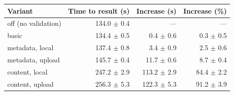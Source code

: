 \begin{tabular}{lrrr}
\toprule
Variant & Time to result (s) & Increase (s) & Increase (\%) \\
\midrule
off (no validation) & 134.0 $\pm$ 0.4 & --- & --- \\
basic & 134.4 $\pm$ 0.5 & 0.4 $\pm$ 0.6 & 0.3 $\pm$ 0.5 \\
metadata, local & 137.4 $\pm$ 0.8 & 3.4 $\pm$ 0.9 & 2.5 $\pm$ 0.6 \\
metadata, upload & 145.7 $\pm$ 0.4 & 11.7 $\pm$ 0.6 & 8.7 $\pm$ 0.4 \\
content, local & 247.2 $\pm$ 2.9 & 113.2 $\pm$ 2.9 & 84.4 $\pm$ 2.2 \\
content, upload & 256.3 $\pm$ 5.3 & 122.3 $\pm$ 5.3 & 91.2 $\pm$ 3.9 \\
\bottomrule
\end{tabular}
